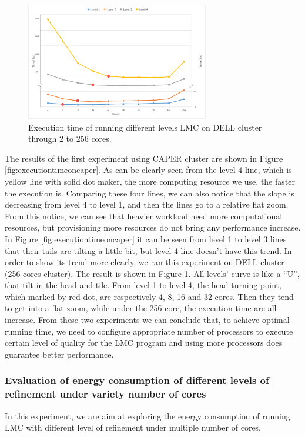 \begin{figure}[H]
	\centering
    \includegraphics[width=8cm]{figs/Dell_lev1-4_run_time_edited.jpg}
        \caption{Execution time of running different levels LMC on DELL cluster through 2 to 256 cores. }
        \label{fig:executiontimeondell}
\end{figure}


The results of the first experiment using CAPER cluster are shown in Figure \ref{fig:executiontimeoncaper}. As can be clearly seen from the level 4 line, which is yellow line with solid dot maker, the more computing resource we use, the faster the execution is. Comparing these four lines, we can also notice that the slope is decreasing from level 4 to level 1, and then the lines go to a relative flat zoom. From this notice, we can see that heavier workload need more computational resources, but provisioning more resources do not bring any performance increase. In Figure \ref{fig:executiontimeoncaper} it can be seen from level 1 to level 3 lines that their tails are tilting a little bit, but level 4 line doesn’t have this trend. In order to show its trend more clearly, we ran this experiment on DELL cluster (256 cores cluster). The result is shown in Figure \ref{fig:executiontimeondell}. All levels' curve is like a ``U'', that tilt in the head and tile. From level 1 to level 4, the head turning point, which marked by red dot, are respectively 4, 8, 16 and 32 cores. Then they tend to get into a flat zoom, while under the 256 core, the execution time are all increase. From these two experiments we can conclude that, to achieve optimal running time, we need to configure appropriate number of processors to execute certain level of quality for the LMC program and using more processors does guarantee better performance.



\subsubsection{Evaluation of energy consumption of different levels of refinement under variety number of cores}
In this experiment, we are aim at exploring the energy consumption of running LMC with different level of refinement under multiple number of cores. 

